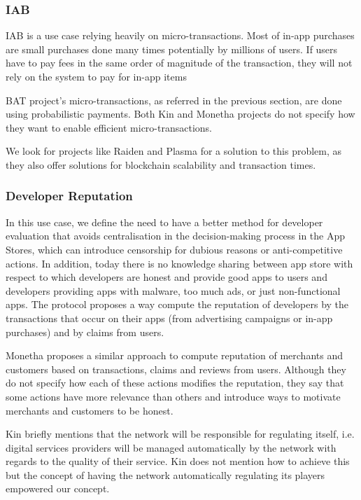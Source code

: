 \subsubsection{IAB}

IAB is a use case relying heavily on micro-transactions. Most of in-app purchases are small purchases done many times potentially by millions of users. If users have to pay fees in the same order of magnitude of the transaction, they will not rely on the system to pay for in-app items

\medskip

BAT project's micro-transactions, as referred in the previous section, are done using probabilistic payments. Both Kin and Monetha projects do not specify how they want to enable efficient micro-transactions.

\medskip

We look for projects like Raiden and Plasma for a solution to this problem, as they also offer solutions for blockchain scalability and transaction times.

\subsubsection{Developer Reputation}

In this use case, we define the need to have a better method for developer evaluation that avoids centralisation in the decision-making process in the App Stores, which can introduce censorship for dubious reasons or anti-competitive actions. In addition, today there is no knowledge sharing between app store with respect to which developers are honest and provide good apps to users and developers providing apps with malware, too much ads, or just non-functional apps. The protocol proposes a way compute the reputation of developers by the transactions that occur on their apps (from advertising campaigns or in-app purchases) and by claims from users.

\medskip

Monetha proposes a similar approach to compute reputation of merchants and customers based on transactions, claims and reviews from users. Although they do not specify how each of these actions modifies the reputation, they say that some actions have more relevance than others and introduce ways to motivate merchants and customers to be honest.

\medskip

Kin briefly mentions that the network will be responsible for regulating itself, i.e. digital services providers will be managed automatically by the network with regards to the quality of their service. Kin does not mention how to achieve this but the concept of having the network automatically regulating its players empowered our concept.

